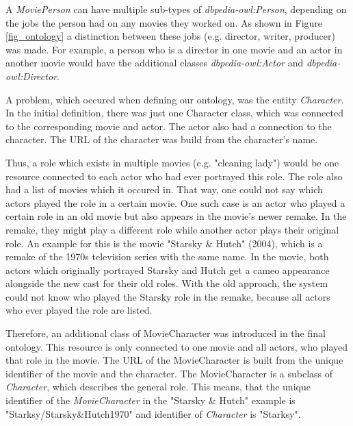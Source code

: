 A \textit{MoviePerson} can have multiple sub-types of \textit{dbpedia-owl:Person}, depending on the jobs the person had on any movies they worked on.
As shown in Figure \ref{fig_ontology} a distinction between these jobs (e.g. director, writer, producer) was made.
For example, a person who is a director in one movie and an actor in another movie would have the additional classes \textit{dbpedia-owl:Actor} and \textit{dbpedia-owl:Director}.

A problem, which occured when defining our ontology, was the entity \textit{Character}.
In the initial definition, there was just one Character class, which was connected to the corresponding movie and actor.
The actor also had a connection to the character.
The URL of the character was build from the character's name.

Thus, a role which exists in multiple movies (e.g. "cleaning lady") would be one resource connected to each actor who had ever portrayed this role.
The role also had a list of movies which it occured in.
That way, one could not say which actors played the role in a certain movie.
One such case is an actor who played a certain role in an old movie but also appears in the movie's newer remake.
In the remake, they might play a different role while another actor plays their original role.
An example for this is the movie "Starsky \& Hutch" (2004), which is a remake of the 1970s television series with the same name.
In the movie, both actors which originally portrayed Starsky and Hutch get a cameo appearance alongside the new cast for their old roles.
With the old approach, the system could not know who played the Starsky role in the remake, because all actors who ever played the role are listed.

Therefore, an additional class of MovieCharacter was introduced in the final ontology.
This resource is only connected to one movie and all actors, who played that role in the movie.
The URL of the MovieCharacter is built from the unique identifier of the movie and the character.
The MovieCharacter is a subclass of \textit{Character}, which describes the general role.
This means, that the unique identifier of the \textit{MovieCharacter} in the "Starsky \& Hutch" example is "Starksy/Starsky\&Hutch1970" and identifier of \textit{Character} is "Starksy".

